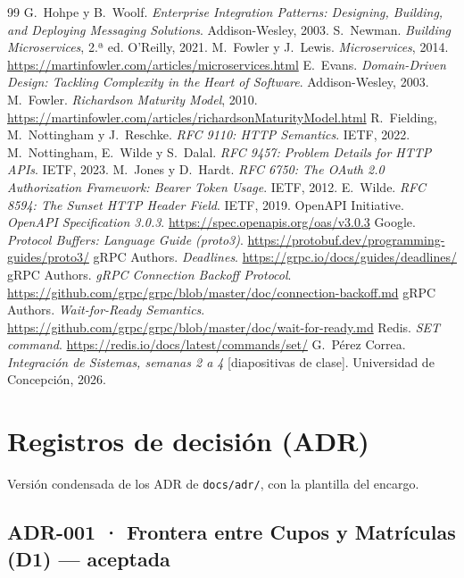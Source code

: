 \documentclass[11pt,spanish]{article}
\begin{document}
\begin{thebibliography}{99}
 G.~Hohpe y B.~Woolf. \emph{Enterprise Integration Patterns: Designing, Building, and Deploying Messaging Solutions}. Addison-Wesley, 2003.
 S.~Newman. \emph{Building Microservices}, 2.ª ed. O'Reilly, 2021.
 M.~Fowler y J.~Lewis. \emph{Microservices}, 2014. \url{https://martinfowler.com/articles/microservices.html}
 E.~Evans. \emph{Domain-Driven Design: Tackling Complexity in the Heart of Software}. Addison-Wesley, 2003.
 M.~Fowler. \emph{Richardson Maturity Model}, 2010. \url{https://martinfowler.com/articles/richardsonMaturityModel.html}
 R.~Fielding, M.~Nottingham y J.~Reschke. \emph{RFC 9110: HTTP Semantics}. IETF, 2022.
 M.~Nottingham, E.~Wilde y S.~Dalal. \emph{RFC 9457: Problem Details for HTTP APIs}. IETF, 2023.
 M.~Jones y D.~Hardt. \emph{RFC 6750: The OAuth 2.0 Authorization Framework: Bearer Token Usage}. IETF, 2012.
 E.~Wilde. \emph{RFC 8594: The Sunset HTTP Header Field}. IETF, 2019.
 OpenAPI Initiative. \emph{OpenAPI Specification 3.0.3}. \url{https://spec.openapis.org/oas/v3.0.3}
 Google. \emph{Protocol Buffers: Language Guide (proto3)}. \url{https://protobuf.dev/programming-guides/proto3/}
 gRPC Authors. \emph{Deadlines}. \url{https://grpc.io/docs/guides/deadlines/}
 gRPC Authors. \emph{gRPC Connection Backoff Protocol}. \url{https://github.com/grpc/grpc/blob/master/doc/connection-backoff.md}
 gRPC Authors. \emph{Wait-for-Ready Semantics}. \url{https://github.com/grpc/grpc/blob/master/doc/wait-for-ready.md}
 Redis. \emph{SET command}. \url{https://redis.io/docs/latest/commands/set/}
 G.~Pérez Correa. \emph{Integración de Sistemas, semanas 2 a 4} [diapositivas de clase]. Universidad de Concepción, 2026.
\end{thebibliography}

\appendix
\section{Registros de decisión (ADR)}\label{anexo:adr}

Versión condensada de los ADR de \texttt{docs/adr/}, con la plantilla del encargo.

\subsection*{ADR-001 · Frontera entre Cupos y Matrículas (D1) — aceptada}
\end{document}
